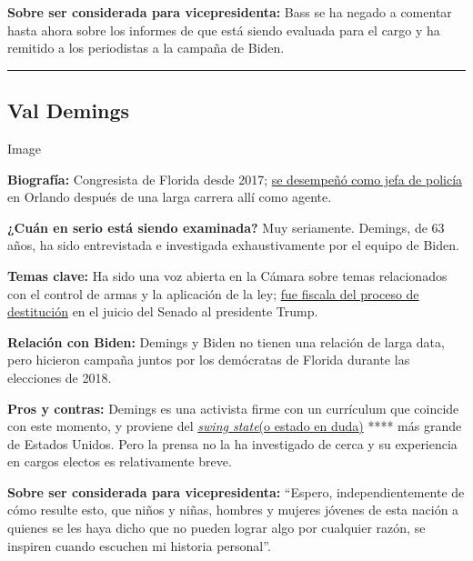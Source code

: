 \textbf{Sobre ser considerada para vicepresidenta:} Bass se ha negado a
comentar hasta ahora sobre los informes de que está siendo evaluada para
el cargo y ha remitido a los periodistas a la campaña de Biden.

\begin{center}\rule{0.5\linewidth}{\linethickness}\end{center}

\hypertarget{val-demings}{%
\subsection{Val Demings}\label{val-demings}}

Image

\textbf{Biografía:} Congresista de Florida desde 2017;
\href{https://www.nytimes3xbfgragh.onion/2020/01/15/us/politics/who-is-val-demings.html}{se
desempeñó como jefa de policía} en Orlando después de una larga carrera
allí como agente.

\textbf{¿Cuán en serio está siendo examinada?} Muy seriamente. Demings,
de 63 años, ha sido entrevistada e investigada exhaustivamente por el
equipo de Biden.

\textbf{Temas clave:} Ha sido una voz abierta en la Cámara sobre temas
relacionados con el control de armas y la aplicación de la ley;
\href{https://www.nytimes3xbfgragh.onion/2020/01/15/us/politics/impeachment-briefing-meet-the-managers.html}{fue
fiscala del proceso de destitución} en el juicio del Senado al
presidente Trump.

\textbf{Relación con Biden:} Demings y Biden no tienen una relación de
larga data, pero hicieron campaña juntos por los demócratas de Florida
durante las elecciones de 2018.

\textbf{Pros y contras:} Demings es una activista firme con un
currículum que coincide con este momento, y proviene del
\href{https://www.bbc.com/mundo/noticias-internacional-37784288}{\emph{swing
state}}\href{https://www.bbc.com/mundo/noticias-internacional-37784288}{(o
estado en duda)} **** más grande de Estados Unidos. Pero la prensa no la
ha investigado de cerca y su experiencia en cargos electos es
relativamente breve.

\textbf{Sobre ser considerada para vicepresidenta:} ``Espero,
independientemente de cómo resulte esto, que niños y niñas, hombres y
mujeres jóvenes de esta nación a quienes se les haya dicho que no pueden
lograr algo por cualquier razón, se inspiren cuando escuchen mi historia
personal''.

